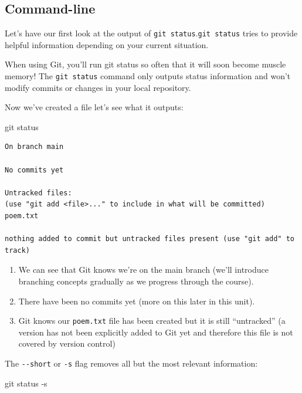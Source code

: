 \documentclass[
  letterpaper,
  DIV=11,
  numbers=noendperiod]{scrartcl}
\newenvironment{Shaded}{\begin{snugshade}}{\end{snugshade}}
\newcommand{\NormalTok}[1]{\textcolor[rgb]{0.00,0.23,0.31}{#1}}
\newcommand{\SpecialCharTok}[1]{\textcolor[rgb]{0.37,0.37,0.37}{#1}}
\begin{document}
\subsection{Command-line}

Let's have our first look at the output of
\texttt{git\ status}.\texttt{git\ status} tries to provide helpful
information depending on your current situation.

When using Git, you'll run git status so often that it will soon become
muscle memory! The \texttt{git\ status} command only outputs status
information and won't modify commits or changes in your local
repository.

Now we've created a file let's see what it outputs:

\begin{Shaded}
\begin{Highlighting}[]
\NormalTok{git status}
\end{Highlighting}
\end{Shaded}

\begin{verbatim}
On branch main

No commits yet

Untracked files:
(use "git add <file>..." to include in what will be committed)
poem.txt

nothing added to commit but untracked files present (use "git add" to track)
\end{verbatim}

\begin{enumerate}
\def\labelenumi{\arabic{enumi}.}
\item
  We can see that Git knows we're on the main branch (we'll introduce
  branching concepts gradually as we progress through the course).
\item
  There have been no commits yet (more on this later in this unit).
\item
  Git knows our \texttt{poem.txt} file has been created but it is still
  ``untracked'' (a version has not been explicitly added to Git yet and
  therefore this file is not covered by version control)
\end{enumerate}

The \texttt{-\/-short} or \texttt{-s} flag removes all but the most
relevant information:

\begin{Shaded}
\begin{Highlighting}[]
\NormalTok{git status }\SpecialCharTok{{-}}\NormalTok{s}
\end{Highlighting}
\end{Shaded}
\end{document}
